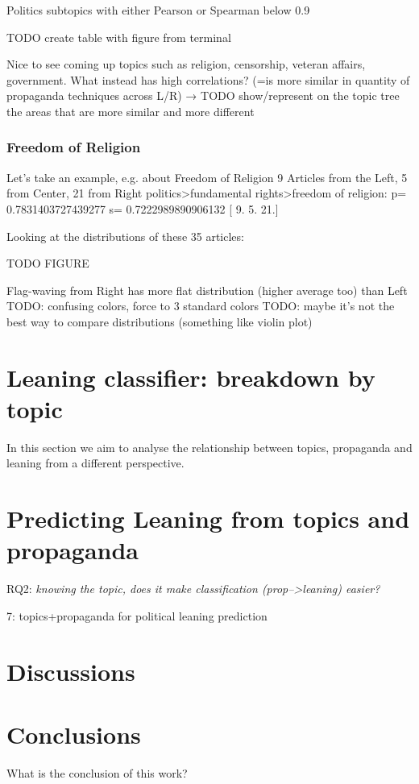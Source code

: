 Politics subtopics with either Pearson or Spearman below 0.9

TODO create table with figure from terminal

Nice to see coming up topics such as religion, censorship, veteran affairs, government.
What instead has high correlations? (=is more similar in quantity of propaganda techniques across L/R) → TODO show/represent on the topic tree the areas that are more similar and more different


\subsubsection{Freedom of Religion}
Let’s take an example, e.g. about Freedom of Religion
9 Articles from the Left, 5 from Center, 21 from Right
politics>fundamental rights>freedom of religion: p= 0.7831403727439277 s= 0.7222989890906132 [ 9.  5. 21.]

Looking at the distributions of these 35 articles:

TODO FIGURE

Flag-waving from Right has more flat distribution (higher average too) than Left
TODO: confusing colors, force to 3 standard colors
TODO: maybe it’s not the best way to compare distributions (something like violin plot)



\section{Leaning classifier: breakdown by topic}

In this section we aim to analyse the relationship between topics, propaganda and leaning from a different perspective.


\section{Predicting Leaning from topics and propaganda}


RQ2: \emph{knowing the topic, does it make classification (prop-->leaning) easier?}

7: topics+propaganda for political leaning prediction


\section{Discussions}


\section{Conclusions}
What is the conclusion of this work?
